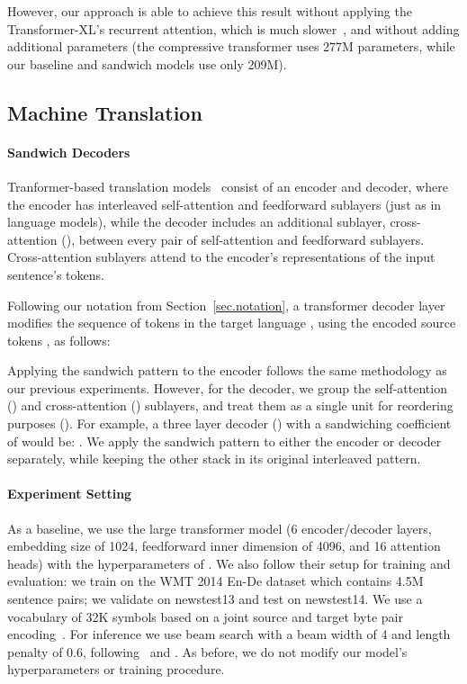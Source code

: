 \documentclass[11pt,a4paper]{article}
\begin{document}
However, our approach is able to achieve this result without applying the Transformer-XL's recurrent attention, which is much slower~\citep{Sukhbaatar2019}, and without adding additional parameters (the compressive transformer uses 277M parameters, while our baseline and sandwich models use only 209M).



\subsection{Machine Translation}
\label{sec.nmt}

\paragraph{Sandwich Decoders}
Tranformer-based translation models~\cite{AIAYN} consist of an encoder and decoder, where the encoder has interleaved self-attention and feedforward sublayers (just as in language models), while the decoder includes an additional sublayer, cross-attention ({\Large \texttt{}}), between every pair of self-attention and feedforward sublayers. Cross-attention sublayers attend to the encoder's representations of the input sentence's tokens.

Following our notation from Section~\ref{sec.notation}, a transformer decoder layer modifies the sequence of tokens in the target language , using the encoded source tokens , as follows:


Applying the sandwich pattern to the encoder follows the same methodology as our previous experiments. However, for the decoder, we group the self-attention ({\Large \texttt{}}) and cross-attention ({\Large \texttt{}}) sublayers, and treat them as a single unit for reordering purposes ({\Large \texttt{}}). For example, a three layer decoder ({\Large \texttt{}}) with a sandwiching coefficient of  would be: {\Large \texttt{}}.
We apply the sandwich pattern to either the encoder or decoder separately, while keeping the other stack in its original interleaved pattern.

\paragraph{Experiment Setting}
As a baseline, we use the large transformer model (6 encoder/decoder layers, embedding size of 1024, feedforward inner dimension of 4096, and 16 attention heads) with the hyperparameters of \citet{scalingnmt}. We also follow their setup for training and evaluation: we train on the WMT 2014 En-De dataset which contains 4.5M sentence pairs; we validate on newstest13 and test on newstest14. We use a vocabulary of 32K symbols based on a joint source and target byte pair encoding~\cite{bpe}. For inference we use beam search with a beam width of 4 and length penalty of 0.6, following~\citet{AIAYN} and \citet{scalingnmt}. As before, we do not modify our model's hyperparameters or training procedure.
\end{document}
